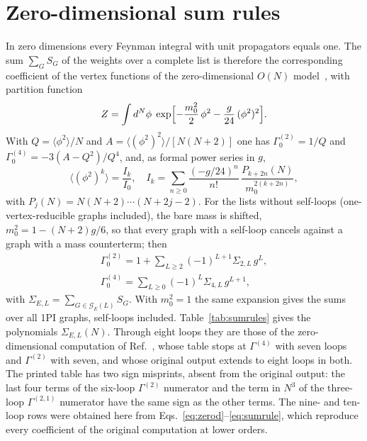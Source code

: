 \section{Zero-dimensional sum rules}
\label{app:sumrules}

In zero dimensions every Feynman integral with unit propagators equals one. The sum $\sum_G S_G$ of the weights over a
complete list is therefore the corresponding coefficient of the vertex functions of the zero-dimensional $O(N)$
model~\cite{CvitanovicLautrupPearson1978,Ribeca2003thesis,Borinsky2017}, with partition function
\begin{equation}
Z=\int d^N\phi\;\exp\Bigl[-\frac{m_0^2}{2}\,\phi^2-\frac{g}{24}\,(\phi^2)^2\Bigr].
\label{eq:zerod}
\end{equation}
With $Q=\langle\phi^2\rangle/N$ and $A=\langle(\phi^2)^2\rangle/[N(N+2)]$ one has $\Gamma^{(2)}_0=1/Q$ and
$\Gamma^{(4)}_0=-3(A-Q^2)/Q^4$, and, as formal power series in $g$,
\begin{equation}
\langle(\phi^2)^k\rangle=\frac{I_k}{I_0},\quad
I_k=\sum_{n\ge0}\frac{(-g/24)^n}{n!}\,\frac{P_{k+2n}(N)}{m_0^{2(k+2n)}},
\label{eq:zerodmoments}
\end{equation}
with $P_j(N)=N(N+2)\cdots(N+2j-2)$. For the lists without self-loops (one-vertex-reducible graphs included), the bare
mass is shifted, $m_0^2=1-(N+2)g/6$, so that every graph with a self-loop cancels against a graph with a mass
counterterm; then
\begin{gather}
\Gamma^{(2)}_0=1+\sum_{L\ge2}(-1)^{L+1}\Sigma_{2,L}\,g^L,\nonumber\\
\Gamma^{(4)}_0=\sum_{L\ge0}(-1)^{L}\Sigma_{4,L}\,g^{L+1},
\label{eq:sumrule}
\end{gather}
with $\Sigma_{E,L}=\sum_{G\in\mathcal G_E(L)}S_G$. With $m_0^2=1$ the same expansion gives the sums over all 1PI graphs,
self-loops included. Table~\ref{tab:sumrules} gives the polynomials $\Sigma_{E,L}(N)$. Through eight loops they are those
of the zero-dimensional computation of Ref.~\cite{Ribeca2003thesis}, whose table stops at $\Gamma^{(4)}$ with seven
loops and $\Gamma^{(2)}$ with seven, and whose original output extends to eight loops in both. The printed table has two
sign misprints, absent from the original output: the last four terms of the six-loop $\Gamma^{(2)}$ numerator and the
term in $N^3$ of the three-loop $\Gamma^{(2,1)}$ numerator have the same sign as the other terms. The nine- and
ten-loop rows were obtained here from Eqs.~\eqref{eq:zerod}--\eqref{eq:sumrule}, which reproduce every coefficient
of the original computation at lower orders.

